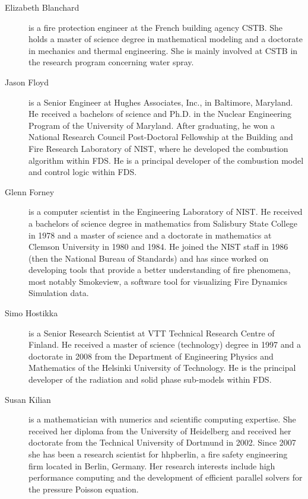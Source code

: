 \begin{description}

\item[Elizabeth Blanchard] is a fire protection engineer at the French building agency CSTB. She holds a master of science degree in mathematical modeling and a doctorate in mechanics and thermal engineering. She is mainly involved at CSTB in the research program concerning water spray.

\item[Jason Floyd] is a Senior Engineer at Hughes Associates, Inc., in Baltimore, Maryland. He received a bachelors of science and Ph.D. in the Nuclear Engineering Program of the University of Maryland. After graduating, he won a National Research Council Post-Doctoral Fellowship at the Building and Fire Research Laboratory of NIST, where he developed the combustion algorithm within FDS. He is a principal developer of the combustion model and control logic within FDS.

\item[Glenn Forney] is a computer scientist in the Engineering Laboratory of NIST. He received a bachelors of science degree in mathematics from Salisbury State College in 1978 and a master of science and a doctorate in mathematics at Clemson University in 1980 and 1984.  He joined the NIST staff in 1986 (then the National Bureau of Standards) and has since worked on developing tools that provide a better understanding of fire phenomena, most notably Smokeview, a software tool for visualizing Fire Dynamics Simulation data.

\item[Simo Hostikka] is a Senior Research Scientist at VTT Technical Research Centre of Finland. He received a master of science (technology) degree in 1997 and a doctorate in 2008 from the Department of Engineering Physics and Mathematics of the Helsinki University of Technology.  He is the principal developer of the radiation and solid phase sub-models within FDS.

\item[Susan Kilian] is a mathematician with numerics and scientific computing expertise. She received her diploma from the University of Heidelberg and received her doctorate from the Technical University of Dortmund in 2002. Since 2007 she has been a research scientist for hhpberlin, a fire safety engineering firm located in Berlin, Germany. Her research interests include high performance computing and the development of efficient parallel solvers for the pressure Poisson equation. 


\end{description}
